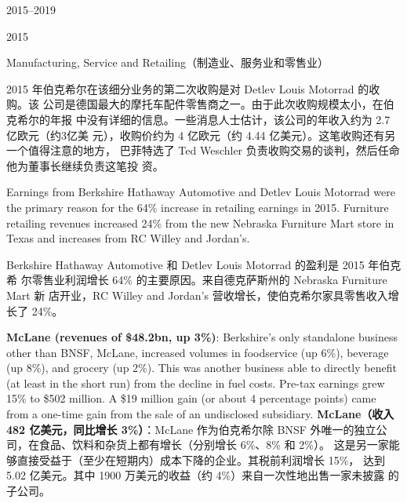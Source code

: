 \begin{chapter}{2015--2019}
\begin{section}{2015}
\begin{subsection}{Manufacturing, Service and Retailing（制造业、服务业和零售业）}
\begin{verseparallel}
{  }
  {
    2015 年伯克希尔在该细分业务的第二次收购是对 Detlev Louis Motorrad 的收购。该
    公司是德国最大的摩托车配件零售商之一。由于此次收购规模太小，在伯克希尔的年报
    中没有详细的信息。一些消息人士估计，该公司的年收入约为 2.7 亿欧元（约3亿美
    元），收购价约为 4 亿欧元（约 4.44 亿美元）。这笔收购还有另一个值得注意的地方，
    巴菲特选了 Ted Weschler 负责收购交易的谈判，然后任命他为董事长继续负责这笔投
    资。
  }
\end{verseparallel}

\begin{verseparallel}
  {
    Earnings from Berkshire Hathaway Automotive and Detlev Louis Motorrad were
    the primary reason for the 64\% increase in retailing earnings in 2015.
    Furniture retailing revenues increased 24\% from the new Nebraska Furniture
    Mart store in Texas and increases from RC Willey and Jordan’s. \\
  }
  {

    Berkshire Hathaway Automotive 和 Detlev Louis Motorrad 的盈利是 2015 年伯克希
    尔零售业利润增长 64\% 的主要原因。来自德克萨斯州的 Nebraska Furniture Mart 新
    店开业，RC Willey and Jordan’s 营收增长，使伯克希尔家具零售收入增长了 24\%。

  }
\end{verseparallel}

\begin{verseparallel}
  {
    \textbf{McLane (revenues of \$48.2bn, up 3\%)}: Berkshire’s only standalone
    business other than BNSF, McLane, increased volumes in foodservice (up
    6\%), beverage (up 8\%), and grocery (up 2\%). This was another business
    able to directly benefit (at least in the short run) from the decline in fuel
    costs. Pre-tax earnings grew 15\% to \$502 million. A \$19 million gain (or
    about 4 percentage points) came from a one-time gain from the sale of an
    undisclosed subsidiary.
  }
  {
    \textbf{McLane（收入 482 亿美元，同比增长 3\%）}：McLane 作为伯克希尔除 BNSF
    外唯一的独立公司，在食品、饮料和杂货上都有增长（分别增长 6\%、8\% 和 2\%）。
    这是另一家能够直接受益于（至少在短期内）成本下降的企业。其税前利润增长 15\%，
    达到 5.02 亿美元。其中 1900 万美元的收益（约 4\%）来自一次性地出售一家未披露
    的子公司。
  }
\end{verseparallel}
\end{subsection}


\end{section}
\end{chapter}
